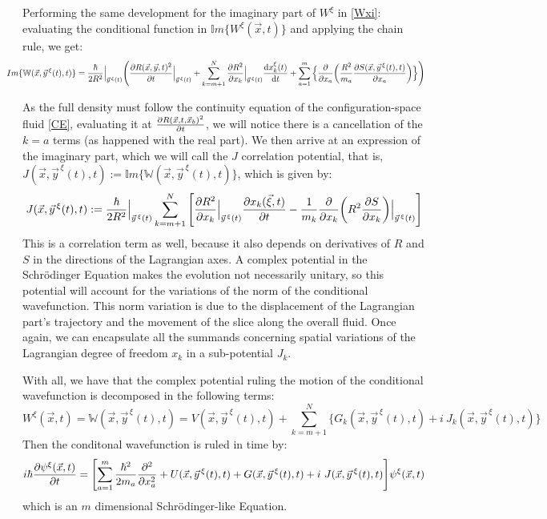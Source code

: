 \documentclass[11pt, a4paper]{article} %
\newcommand{\W}{\mathbb{W}}
\begin{document}
Performing the same development for the imaginary part of $W^\xi$ in \eqref{Wxi}: evaluating the conditional function in $\mathbb{I}m\{W^\xi(\vec{x},t)\}$ and applying the chain rule, we get:
\begin{equation}
\hspace{-0.7cm}Im\{\W(\vec{x}, \vec{y}^{\, \xi}(t),t)\}=\frac{\hbar}{2R^2}\Big\rvert_{\vec{y}^{\, \xi}(t)} \qty( \pdv{R(\vec{x},\vec{y},t)^2}{t}\Big\rvert_{\vec{y}^{\, \xi}(t)} + \sum_{k=m+1}^N \pdv{R^2}{x_k}\Big\rvert_{\vec{y}^{\, \xi}(t)} \dv{x_k^\xi(t)}{t} + \sum_{a=1}^m\Big\{\pdv{}{x_a} \qty(\frac{R^2}{m_a} \pdv{S(\vec{x}, \vec{y}^{\, \xi}(t),t)}{x_a} ) \Big\})
\end{equation}

As the full density must follow the continuity equation of the configuration-space fluid \eqref{CE}, evaluating it at $\pdv{R(\vec{x},t, \vec{x}_b)^2}{t}$, we will notice there is a cancellation of the $k=a$ terms (as happened with the real part). We then arrive at an expression of the imaginary part, which we will call the $J$ correlation potential, that is, $J(\vec{x}, \vec{y}^{\, \xi}(t),t):=\mathbb{I}m\{\W(\vec{x}, \vec{y}^{\, \xi}(t),t)\}$, which is given by:
\begin{equation}\label{J}
J(\vec{x}, \vec{y}^{\, \xi}(t),t):= \frac{\hbar}{2R^2}\Big\rvert_{\vec{y}^{\, \xi}(t)} \sum_{k=m+1}^N \qty[ \pdv{R^2}{x_k}\Big\rvert_{\vec{y}^{\, \xi}(t)} \pdv{x_k(\vec{\xi},t)}{t} - \frac{1}{m_k} \pdv{}{x_k} \qty(R^2 \pdv{S}{x_k} )\Big\rvert_{\vec{y}^{\, \xi}(t)} ]
\end{equation}
This is a correlation term as well, because it also depends on derivatives of $R$ and $S$ in the directions of the Lagrangian axes. A complex potential in the Schrödinger Equation makes the evolution not necessarily unitary, so this potential will account for the variations of the norm of the conditional wavefunction. This norm variation is due to the displacement of the Lagrangian part's trajectory and the movement of the slice along the overall fluid. Once again, we can encapsulate all the summands concerning spatial variations of the Lagrangian degree of freedom $x_k$ in a sub-potential $J_k$. 

With all, we have that the complex potential ruling the motion of the conditional wavefunction is decomposed in the following terms:
\begin{equation}
W^\xi(\vec{x},t)=\W(\vec{x}, \vec{y}^{\, \xi}(t),t)= V(\vec{x}, \vec{y}^{\, \xi}(t),t) + \sum_{k=m+1}^N\Big\{ G_k(\vec{x}, \vec{y}^{\, \xi}(t),t)+i\ J_k(\vec{x}, \vec{y}^{\, \xi}(t),t)\Big\}
\end{equation}
Then the conditonal wavefunction is ruled in time by:
\begin{equation}\label{SE.GJ}
i \hbar \pdv{\psi^\xi (\vec{x},t)}{t} = \qty[\sum_{a=1}^m\frac{\hbar^2}{2m_a} \pdv[2]{}{x_a} +  U(\vec{x}, \vec{y}^{\, \xi}(t),t) + G(\vec{x}, \vec{y}^{\, \xi}(t),t)+i\ J(\vec{x}, \vec{y}^{\, \xi}(t),t)] \psi^\xi (\vec{x},t)
\end{equation}
which is an $m$ dimensional Schrödinger-like Equation.
\end{document}
